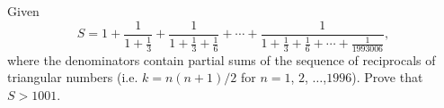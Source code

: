 Given \[ S = 1 + \frac{1}{1 + \frac{1}{3}} + \frac{1}{1 + \frac{1}{3} + \frac{1} {6}} + \cdots + \frac{1}{1 + \frac{1}{3} + \frac{1}{6} + \cdots + \frac{1} {1993006}}, \] where the denominators contain partial sums of the sequence of reciprocals of triangular numbers (i.e. $k=n(n+1)/2$ for $n = 1$, $2$, $\ldots$,$1996$).  Prove that $S>1001$.